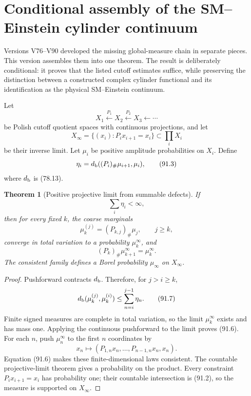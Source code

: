 \documentclass[11pt]{article}
\newtheorem{theorem}{Theorem}[section]
\begin{document}
\section{Conditional assembly of the SM--Einstein cylinder continuum}
\label{sec:v11v91}

Versions V76--V90 developed the missing global-measure chain in
separate pieces.  This version assembles them into one theorem.
The result is deliberately conditional: it proves that the listed
cutoff estimates suffice, while preserving the distinction between a
constructed complex cylinder functional and its identification as the
physical SM--Einstein continuum.

Let
\[
       X_1\xleftarrow{P_1}X_2\xleftarrow{P_2}X_3
       \xleftarrow{}\cdots                                  \tag{91.1}
\]
be Polish cutoff quotient spaces with continuous projections, and let
\[
 X_\infty=\{(x_i):P_ix_{i+1}=x_i\}
              \subset\prod_iX_i                             \tag{91.2}
\]
be their inverse limit.  Let \(\mu_i\) be positive amplitude
probabilities on \(X_i\).  Define
\[
 \eta_i=d_{\rm b}((P_i)_\#\mu_{i+1},\mu_i),                  \tag{91.3}
\]
where \(d_{\rm b}\) is (78.13).

\begin{theorem}[Positive projective limit from summable defects]
\label{thm:v11v91-positive}
If
\[
                                      \sum_i\eta_i<\infty,   \tag{91.4}
\]
then for every fixed \(k\), the coarse marginals
\[
                         \mu_{k}^{(j)}
                  =(P_{k,j})_\#\mu_j,\qquad j\ge k,          \tag{91.5}
\]
converge in total variation to a probability
\(\mu_k^\infty\), and
\[
                         (P_k)_\#\mu_{k+1}^\infty
                         =\mu_k^\infty.                      \tag{91.6}
\]
The consistent family defines a Borel probability
\(\mu_\infty\) on \(X_\infty\).
\end{theorem}

\begin{proof}
Pushforward contracts \(d_{\rm b}\).  Therefore, for \(j>i\ge k\),
\[
 d_{\rm b}(\mu_k^{(j)},\mu_k^{(i)})
 \le\sum_{n=i}^{j-1}\eta_n.                                 \tag{91.7}
\]
Finite signed measures are complete in total variation, so the limit
\(\mu_k^\infty\) exists and has mass one.  Applying the continuous
pushforward to the limit proves (91.6).  For each \(n\), push
\(\mu_n^\infty\) to the first \(n\) coordinates by
\[
 x_n\longmapsto(P_{1,n}x_n,\ldots,P_{n-1,n}x_n,x_n).
\]
Equation (91.6) makes these finite-dimensional laws consistent.
The countable projective-limit theorem gives a probability on the
product.  Every constraint \(P_ix_{i+1}=x_i\) has probability one;
their countable intersection is (91.2), so the measure is supported
on \(X_\infty\).
\end{proof}
\end{document}
